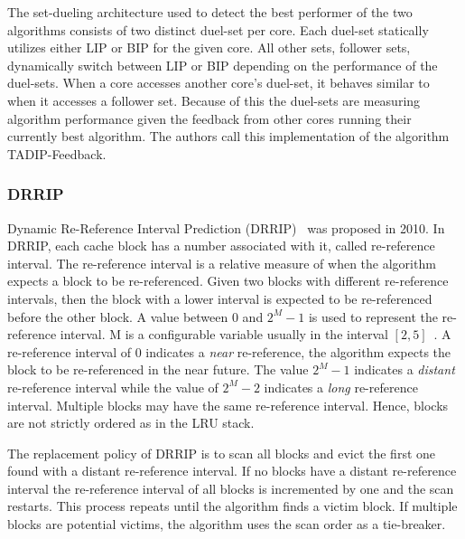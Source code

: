 The set-dueling architecture used to detect the best performer of the two algorithms consists of two distinct duel-set per core.
Each duel-set statically utilizes either LIP or BIP for the given core.
All other sets, follower sets, dynamically switch between LIP or BIP depending on the performance of the duel-sets.
When a core accesses another core's duel-set, it behaves similar to when it accesses a follower set.
Because of this the duel-sets are measuring algorithm performance given the feedback from other cores running their currently best algorithm.
The authors call this implementation of the algorithm TADIP-Feedback.

\subsubsection{DRRIP}

Dynamic Re-Reference Interval Prediction (DRRIP)~\cite{jaleel10} was proposed in 2010.
In DRRIP, each cache block has a number associated with it, called re-reference interval.
The re-reference interval is a relative measure of when the algorithm expects a block to be re-referenced.
Given two blocks with different re-reference intervals, then the block with a lower interval is expected to be re-referenced before the other block.
A value between 0 and $2^M - 1$ is used to represent the re-reference interval.
M is a configurable variable usually in the interval $[2, 5]$~\cite{jaleel10}.
A re-reference interval of 0 indicates a \textit{near} re-reference, the algorithm expects the block to be re-referenced in the near future.
The value $2^M - 1$ indicates a \textit{distant} re-reference interval while the value of $2^M - 2$ indicates a \textit{long} re-reference interval.
Multiple blocks may have the same re-reference interval. 
Hence, blocks are not strictly ordered as in the LRU stack.

The replacement policy of DRRIP is to scan all blocks and evict the first one found with a distant re-reference interval.
If no blocks have a distant re-reference interval the re-reference interval of all blocks is incremented by one and the scan restarts.
This process repeats until the algorithm finds a victim block.
If multiple blocks are potential victims, the algorithm uses the scan order as a tie-breaker.

